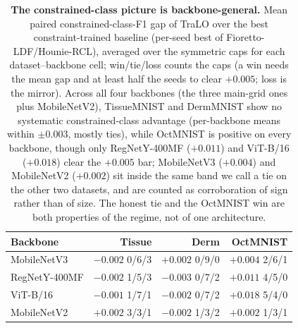 \begin{table}[t]\centering\small
\setlength{\tabcolsep}{4.5pt}
\caption{\textbf{The constrained-class picture is backbone-general.} Mean paired
constrained-class-F1 gap of TraLO over the best constraint-trained baseline (per-seed best of
Fioretto-LDF/Hounie-RCL), averaged over the symmetric caps for each dataset--backbone cell;
{\scriptsize win/tie/loss} counts the caps (a win needs the mean gap and at least half the seeds
to clear $+0.005$; loss is the mirror). Across all four backbones (the three main-grid ones
plus MobileNetV2), TissueMNIST and DermMNIST show no systematic constrained-class advantage
(per-backbone means within $\pm0.003$, mostly ties), while OctMNIST is
{positive on every backbone, though only RegNetY-400MF ($+0.011$) and
ViT-B/16 ($+0.018$) clear the $+0.005$ bar; MobileNetV3 ($+0.004$) and MobileNetV2
($+0.002$) sit inside the same band we call a tie on the other two datasets, and are
counted as corroboration of sign rather than of size}.
The honest tie and the OctMNIST win are both properties of the regime, not of one architecture.}
\label{tab:bbgen}
\begin{tabular}{l rrr}
\toprule
Backbone & Tissue & Derm & OctMNIST \\
\midrule
MobileNetV3    & $-0.002$ {\scriptsize 0/6/3} & $+0.002$ {\scriptsize 0/9/0} & $+0.004$ {\scriptsize 2/6/1} \\
RegNetY-400MF  & $-0.002$ {\scriptsize 1/5/3} & $-0.003$ {\scriptsize 0/7/2} & $+0.011$ {\scriptsize 4/5/0} \\
ViT-B/16       & $-0.001$ {\scriptsize 1/7/1} & $-0.002$ {\scriptsize 0/7/2} & $+0.018$ {\scriptsize 5/4/0} \\
MobileNetV2    & $+0.002$ {\scriptsize 3/3/1} & $-0.002$ {\scriptsize 1/3/2} & $+0.002$ {\scriptsize 1/3/1} \\
\bottomrule
\end{tabular}
\end{table}
